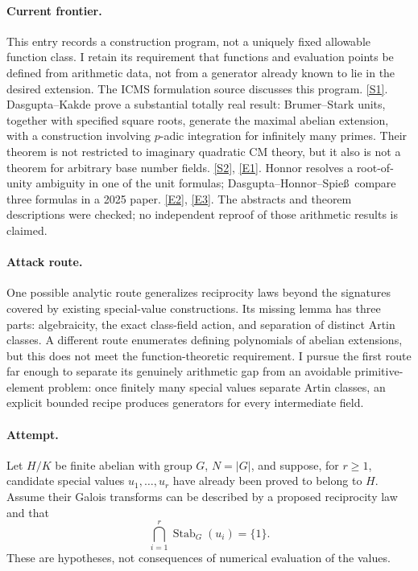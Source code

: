 \documentclass[11pt,a4paper]{article}
\newcommand{\sref}[2]{\hyperlink{source:#1:#2}{[S#2]}}
\newcommand{\eref}[2]{\hyperlink{extra:#1:#2}{[E#2]}}
\numberwithin{equation}{section}
\begin{document}
\paragraph{Current frontier.}
This entry records a construction program, not a uniquely fixed allowable
function class. I retain its requirement that functions and evaluation points
be defined from arithmetic data, not from a generator already known to lie in
the desired extension. The ICMS formulation source discusses this program.
\sref{statement}{1}. Dasgupta--Kakde prove a substantial totally real result:
Brumer--Stark units, together with specified square roots, generate the maximal
abelian extension, with a construction involving $p$-adic integration for
infinitely many primes. Their theorem is not restricted to imaginary quadratic
CM theory, but it also is not a theorem for arbitrary base number fields.
\sref{statement}{2}, \eref{statement}{1}. Honnor resolves a root-of-unity ambiguity in one
of the unit formulas; Dasgupta--Honnor--Spie\ss\ compare three formulas in a
2025 paper. \eref{statement}{2}, \eref{statement}{3}. The abstracts and theorem descriptions
were checked; no independent reproof of those arithmetic results is claimed.

\paragraph{Attack route.}
One possible analytic route generalizes reciprocity laws beyond the signatures
covered by existing special-value constructions. Its missing lemma has three
parts: algebraicity, the exact class-field action, and separation of distinct
Artin classes. A different route enumerates defining polynomials of abelian
extensions, but this does not meet the function-theoretic requirement. I
pursue the first route far enough to separate its genuinely arithmetic gap
from an avoidable primitive-element problem: once finitely many special
values separate Artin classes, an explicit bounded recipe produces generators
for every intermediate field.

\paragraph{Attempt.}
Let $H/K$ be finite abelian with group $G$, $N=|G|$, and suppose, for $r\ge1$, candidate
special values $u_1,\ldots,u_r$ have already been proved to belong to $H$.
Assume their Galois transforms can be described by a proposed reciprocity law
and that
\begin{equation}\label{r36:separation}
 \bigcap_{i=1}^r\operatorname{Stab}_G(u_i)=\{1\}.
\end{equation}
These are hypotheses, not consequences of numerical evaluation of the values.
\end{document}
